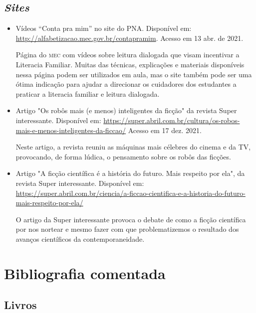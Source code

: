 \documentclass[11pt]{extarticle}
\begin{document}
\subsection{\textit{Sites}}

\begin{itemize}
\item Vídeos “Conta pra mim” no site do PNA. Disponível em: \url{http://alfabetizacao.mec.gov.br/contapramim}. 
Acesso em 13 abr. de 2021.

Página do \textsc{mec} com vídeos sobre leitura dialogada que visam incentivar a Literacia Familiar. Muitas das técnicas, explicações e materiais disponíveis nessa página podem ser utilizados em aula, mas o site também pode ser uma ótima indicação para ajudar a direcionar os cuidadores dos estudantes a praticar a literacia familiar e leitura dialogada.

\item Artigo "Os robôs mais (e menos) inteligentes da ficção" da revista Super interessante. Disponível em: \url{https://super.abril.com.br/cultura/os-robos-mais-e-menos-inteligentes-da-ficcao/} Acesso em 17 dez. 2021. 

Neste artigo, a revista reuniu as máquinas mais célebres do cinema e da TV, provocando, de forma lúdica, o pensamento sobre os robôs das ficções.

\item Artigo "A ficção científica é a história do futuro. Mais respeito por ela", da revista Super interessante. Disponível em: \url{https://super.abril.com.br/ciencia/a-ficcao-cientifica-e-a-historia-do-futuro-mais-respeito-por-ela/}

O artigo da Super interessante provoca o debate de como a ficção científica por nos nortear e mesmo fazer com que problematizemos o resultado dos avanços científicos da contemporaneidade.

\end{itemize}

\section{Bibliografia comentada}

\subsection{Livros}
\end{document}
